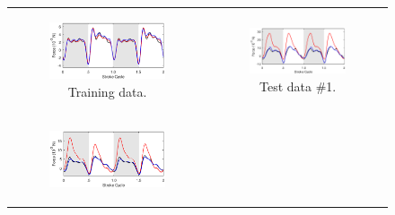 \documentclass{article}
\begin{document}
\begin{figure}[ht]
\centering
\begin{tabular}{cc}
\begin{subfigure}{0.48\textwidth}
\centering
\includegraphics[width=\textwidth]{figures/eq_goodbad_1}
\caption{\label{fig:eq_goodbad_1} Training data.}
\end{subfigure} &
\begin{subfigure}{0.48\textwidth}
\centering
\includegraphics[width=\textwidth]{figures/eq_goodbad_2}
\caption{\label{fig:eq_goodbad_2} Test data \#1.}
\end{subfigure} \\
\begin{subfigure}{0.48\textwidth}
\centering
\includegraphics[width=\textwidth]{figures/eq_goodbad_3}

\end{subfigure}
\end{tabular}
\end{figure}
\end{document}
